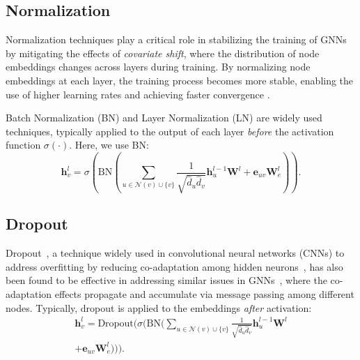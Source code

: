 \subsection{Normalization}

Normalization techniques play a critical role in stabilizing the training of GNNs by mitigating the effects of \emph{covariate shift}, where the distribution of node embeddings changes across layers during training. By normalizing node embeddings at each layer, the training process becomes more stable, enabling the use of higher learning rates and achieving faster convergence \cite{cai2021graphnorm}.

Batch Normalization (BN) \cite{ioffe2015batch} and Layer Normalization (LN) \cite{ba2016layer} are widely used techniques, typically applied to the output of each layer \emph{before} the activation function \(\sigma(\cdot)\). Here, we use BN:
\begin{equation}
\boldsymbol{h}_v^l = \sigma(\text{BN}(\sum_{u \in \mathcal{N}(v) \cup \{v\}} \frac{1}{\sqrt{\hat{d}_u \hat{d}_v}} \boldsymbol{h}_{u}^{l-1}\boldsymbol{W}^l + \boldsymbol{e}_{uv}\boldsymbol{W}^l_e)).
\end{equation}
\vspace{-0.2 in}
\subsection{Dropout}

Dropout~\cite{srivastava2014dropout}, a technique widely used in convolutional neural networks (CNNs) to address overfitting by reducing co-adaptation among hidden neurons~\cite{hinton2012improving,yosinski2014transferable}, has also been found to be effective in addressing similar issues in GNNs~\cite{shu2022understanding}, where the co-adaptation effects propagate and accumulate via message passing among different nodes. Typically, dropout is applied to the embeddings \emph{after} activation:
\begin{align}
\nonumber \boldsymbol{h}_v^l = \text{Dropout}(\sigma(\text{BN}(\sum_{u \in \mathcal{N}(v) \cup \{v\}} \frac{1}{\sqrt{\hat{d}_u \hat{d}_v}} \boldsymbol{h}_{u}^{l-1}\boldsymbol{W}^l \\+ 
\boldsymbol{e}_{uv}\boldsymbol{W}^l_e))).
\end{align} 
\vspace{-0.35 in}
